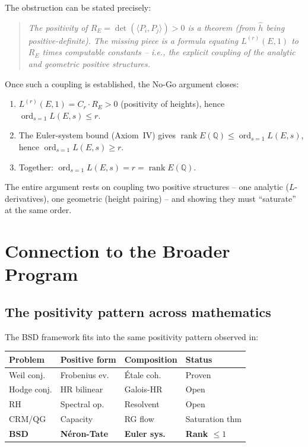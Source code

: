 \documentclass[aps,prd,twocolumn,superscriptaddress,nofootinbib]{revtex4-2}
\theoremstyle{definition}
\theoremstyle{remark}
\DeclareMathOperator{\ord}{ord}
\DeclareMathOperator{\rank}{rank}
\begin{document}
The obstruction can be stated precisely:

\begin{quote}
\textit{The positivity of $R_E = \det(\langle P_i, P_j \rangle) > 0$ is a theorem (from $\hat{h}$ being positive-definite). The missing piece is a formula equating $L^{(r)}(E,1)$ to $R_E$ times computable constants -- i.e., the explicit coupling of the analytic and geometric positive structures.}
\end{quote}

Once such a coupling is established, the No-Go argument closes:
\begin{enumerate}
\item $L^{(r)}(E,1) = C_r \cdot R_E > 0$ (positivity of heights), hence $\ord_{s=1} L(E,s) \leq r$.
\item The Euler-system bound (Axiom~IV) gives $\rank E(\mathbb{Q}) \leq \ord_{s=1} L(E,s)$, hence $\ord_{s=1} L(E,s) \geq r$.
\item Together: $\ord_{s=1} L(E,s) = r = \rank E(\mathbb{Q})$.
\end{enumerate}

The entire argument rests on coupling two positive structures -- one analytic ($L$-derivatives), one geometric (height pairing) -- and showing they must ``saturate'' at the same order.


\section{Connection to the Broader Program}
\label{sec:connection}

\subsection{The positivity pattern across mathematics}

The BSD framework fits into the same positivity pattern observed in:

\begin{center}
\begin{tabular}{llll}
\toprule
Problem & Positive form & Composition & Status \\
\midrule
Weil conj. & Frobenius ev. & \'Etale coh. & Proven \\
Hodge conj. & HR bilinear & Galois-HR & Open \\
RH \cite{GeigerRH2026c} & Spectral op. & Resolvent & Open \\
CRM/QG \cite{FST-Unified2026} & Capacity & RG flow & Saturation thm \\
\textbf{BSD} & \textbf{N\'eron-Tate} & \textbf{Euler sys.} & \textbf{Rank $\leq 1$} \\
\bottomrule
\end{tabular}
\end{center}
\end{document}
